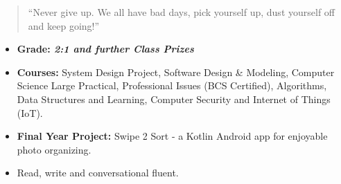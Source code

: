 \begin{quote}
``Never give up. We all have bad days, pick yourself up, dust yourself off and keep going!''
\end{quote}


\smallskip
\smallskip
\smallskip
\smallskip


\begin{itemize}
\item \textbf{Grade: \textit{2:1 and further Class Prizes}}
\item \textbf{Courses:} System Design Project, Software Design \& Modeling, Computer Science Large Practical, Professional Issues (BCS Certified), Algorithms, Data Structures and Learning, Computer Security and Internet of Things (IoT).
\item \textbf{Final Year Project:} Swipe 2 Sort - a Kotlin Android app for enjoyable photo organizing.
\end{itemize}
\divider





{}
{}
{}
{}
{}
{}
{}
{}
{}
{}
{}
\smallskip
\smallskip






\begin{itemize}
\item Read, write and conversational fluent.
\smallskip
\smallskip
\end{itemize}

